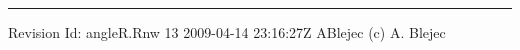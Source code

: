 \documentclass[a4paper,12pt]{article}
\newcommand{\SVNRevision}{$ $Rev: 13 $ $}
\newcommand{\SVNId}{$ $Id: angleR.Rnw 13 2009-04-14 23:16:27Z ABlejec $ $}
\begin{document}
%
%


\vfill
\hrule
\vspace{2pt}
\footnotesize{
Revision \SVNId\hfill (c) A. Blejec%
}
\end{document}
